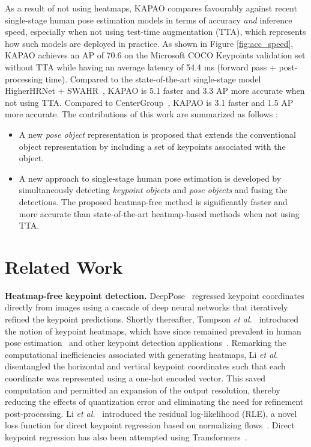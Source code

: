 \documentclass[runningheads]{llncs}
\newcommand{\etal}{\textit{et al.}}
\newcommand\hlll[1]{\bgroup
  \hskip0pt\color{black}#1\egroup
}
\begin{document}
As a result of not using heatmaps, KAPAO compares favourably against recent single-stage human pose estimation models in terms of accuracy \textit{and} inference speed, especially when not using test-time augmentation (TTA), which \hlll{represents} how such models are deployed in practice. As shown in Figure \ref{fig:acc_speed}, KAPAO achieves an AP of 70.6 on the Microsoft COCO Keypoints validation set without TTA \hlll{while having} an average latency of 54.4 ms (forward pass + post-processing time). Compared to the state-of-the-art single-stage model HigherHRNet + SWAHR~\cite{luo2021rethinking}, KAPAO is 5.1 faster and 3.3 AP more accurate when not using TTA. Compared to CenterGroup~\cite{braso2021center}, KAPAO is 3.1 faster and 1.5 AP more accurate. 
The contributions of this work are summarized \hlll{as follows}:
\begin{itemize}
    \item A new \textit{pose object} representation is proposed that extends the conventional object representation by including a set of keypoints associated with the object. 
    \smallskip
    \item A new approach to single-stage human pose estimation is developed by simultaneously detecting \textit{keypoint objects} and \textit{pose objects} and fusing the detections. The proposed heatmap-free method is significantly faster and more accurate than state-of-the-art heatmap-based methods when not \hlll{using} TTA.
\end{itemize} 


\section{Related Work}
\smallskip\noindent\textbf{Heatmap-free keypoint detection.}
DeepPose~\cite{toshev2014deeppose} regressed keypoint coordinates directly from images using a cascade of deep neural networks that iteratively refined the keypoint predictions. Shortly thereafter, Tompson \etal~\cite{tompson2014joint} introduced the notion of keypoint heatmaps, which have since remained prevalent in human pose estimation~\cite{wei2016convolutional, newell2016stacked, cao2017realtime, chen2018cascaded, xiao2018simple, sun2019deep, cheng2020higherhrnet, geng2021bottom, mcnally2021evopose2d, khirodkar2021multi, yang2021transpose} and other keypoint \hlll{detection} applications~\cite{iqbal2018hand, dong2018style, wang2019adaptive, huang2020awr, vats2019pucknet}. Remarking the computational inefficiencies associated with generating heatmaps, Li \etal~\cite{li20212d} disentangled the horizontal and vertical keypoint coordinates such that each coordinate was represented using a one-hot encoded vector. \hlll{This} saved computation and permitted an expansion of the output resolution, thereby reducing the effects of quantization error and eliminating the need for refinement post-processing. Li \etal~\cite{li2021human} introduced the residual log-likelihood (RLE), a novel loss function for direct keypoint regression based on normalizing flows~\cite{rezende2015variational}. Direct keypoint regression has also been attempted using Transformers~\cite{li2021pose}. 
\end{document}
